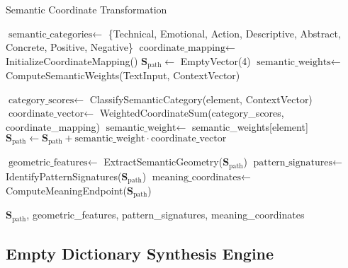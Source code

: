 \documentclass[12pt,a4paper]{article}
\begin{document}
\begin{algorithm}[H]
\caption{Semantic Coordinate Transformation}
\label{alg:semantic_transformation}
\begin{algorithmic}[1]
    \State $\text{semantic\_categories} \gets$ \{Technical, Emotional, Action, Descriptive, Abstract, Concrete, Positive, Negative\}
    \State $\text{coordinate\_mapping} \gets$ InitializeCoordinateMapping()
    \State $\mathbf{S}_{\text{path}} \gets$ EmptyVector(4)
    \State $\text{semantic\_weights} \gets$ ComputeSemanticWeights(TextInput, ContextVector)
    
        \State $\text{category\_scores} \gets$ ClassifySemanticCategory(element, ContextVector)
        \State $\text{coordinate\_vector} \gets$ WeightedCoordinateSum(category\_scores, coordinate\_mapping)
        \State $\text{semantic\_weight} \gets$ semantic\_weights[element]
        \State $\mathbf{S}_{\text{path}} \gets \mathbf{S}_{\text{path}} + \text{semantic\_weight} \cdot \text{coordinate\_vector}$
    \EndFor
    
    \State $\text{geometric\_features} \gets$ ExtractSemanticGeometry($\mathbf{S}_{\text{path}}$)
    \State $\text{pattern\_signatures} \gets$ IdentifyPatternSignatures($\mathbf{S}_{\text{path}}$)
    \State $\text{meaning\_coordinates} \gets$ ComputeMeaningEndpoint($\mathbf{S}_{\text{path}}$)
    
    \State \Return $\mathbf{S}_{\text{path}}$, geometric\_features, pattern\_signatures, meaning\_coordinates
\EndProcedure
\end{algorithmic}
\end{algorithm}

\subsection{Empty Dictionary Synthesis Engine}
\end{document}
